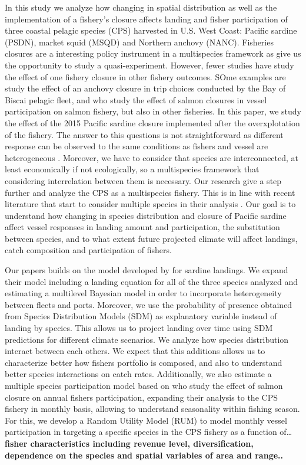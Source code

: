 \documentclass[
]{article}
\begin{document}
In this study we analyze how changing in spatial distribution as well as
the implementation of a fishery's closure affects landing and fisher
participation of three coastal pelagic species (CPS) harvested in U.S.
West Coast: Pacific sardine (PSDN), market squid (MSQD) and Northern
anchovy (NANC). Fisheries closures are a interesting policy instrument
in a multispecies framework as give us the opportunity to study a
quasi-experiment. However, fewer studies have study the effect of one
fishery closure in other fishery outcomes. SOme examples are
\citet{vermard2008} study the effect of an anchovy closure in trip
choices conducted by the Bay of Biscai pelagic fleet, and
\citet{richerson2017} who study the effect of salmon closures in vessel
participation on salmon fishery, but also in other fisheries. In this
paper, we study the effect of the 2015 Pacific sardine closure
implemented after the overxplotation of the fishery. The answer to this
questions is not straightforward as different response can be observed
to the same conditions as fishers and vessel are heterogeneous
\citep{zhang2011}. Moreover, we have to consider that species are
interconnected, at least economically if not ecologically, so a
multispecies framework that considering interrelation between them is
necessary. Our research give a step further and analyze the CPS as a
multispecies fishery. This is in line with recent literature that start
to consider multiple species in their analysis \citep{richerson2017}.
Our goal is to understand how changing in species distribution and
closure of Pacific sardine affect vessel responses in landing amount and
participation, the substitution between species, and to what extent
future projected climate will affect landings, catch composition and
participation of fishers.

Our papers builds on the model developed by \citet{smith2021potential}
for sardine landings. We expand their model including a landing equation
for all of the three species analyzed and estimating a multilevel
Bayesian model in order to incorporate heterogeneity between fleets and
ports. Moreover, we use the probability of presence obtained from
Species Distribution Models (SDM) as explanatory variable instead of
landing by species. This allows us to project landing over time using
SDM predictions for different climate scenarios. We analyze how species
distribution interact between each others. We expect that this additions
allows us to characterize better how fishers portfolio is composed, and
also to understand better species interactions on catch rates.
Additionally, we also estimate a multiple species participation model
based on \citet{richerson2017} who study the effect of salmon closure on
annual fishers participation, expanding their analysis to the CPS
fishery in monthly basis, allowing to understand seasonality within
fishing season. For this, we develop a Random Utility Model (RUM) to
model monthly vessel participation in targeting a specific species in
the CPS fishery as a function of\ldots{} \textbf{fisher characteristics
including revenue level, diversification, dependence on the species and
spatial variables of area and range..}
\end{document}
